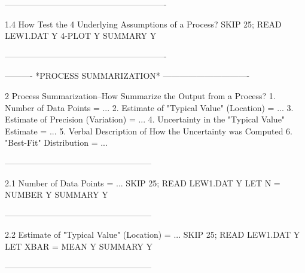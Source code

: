 ----------------------------------------------------------
 
1.4
How Test the 4 Underlying Assumptions of a Process?
      SKIP 25; READ LEW1.DAT Y
      4-PLOT Y
      SUMMARY Y
 
----------------------------------------------------------
 
 
 
 
 
 
 
 
 
 
 
 
 
 
 
 
 
 
 
 
 
 
 
 
 
 
 
 
 
 
 
 
 
 
 
 
 
 
 
 
 
 
 
 
 
 
 
 
 
 
 
 
 
 
 
 
 
----------  *PROCESS SUMMARIZATION*  -------------------------------
 
2
Process Summarization--How Summarize the Output from a Process?
   1. Number of Data Points = ...
   2. Estimate of "Typical Value" (Location) = ...
   3. Estimate of Precision (Variation) = ...
   4. Uncertainty in the "Typical Value" Estimate = ...
   5. Verbal Description of How the Uncertainty was Computed
   6. "Best-Fit" Distribution = ...
 
-----------------------------------------------------
 
2.1
Number of Data Points = ...
      SKIP 25; READ LEW1.DAT Y
      LET N = NUMBER Y
      SUMMARY Y
 
-----------------------------------------------------
 
2.2
Estimate of "Typical Value" (Location) = ...
      SKIP 25; READ LEW1.DAT Y
      LET XBAR = MEAN Y
      SUMMARY Y
 
-----------------------------------------------------
 
